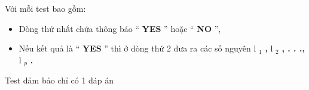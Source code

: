 Với mỗi test bao gồm:
\begin{itemize}
	\item Dòng thứ nhất chứa thông báo “ \textbf{YES} ” hoặc “ \textbf{NO} ”,
	\item Nếu kết quả là “ \textbf{YES} ” thì ở dòng thứ 2 đưa ra các số nguyên l \textbf{$_ 1 $}\textbf{ , } l \textbf{$_ 2 $}\textbf{ , . . ., } l $_ p $\textbf{ . }
\end{itemize}

Test đảm bảo chỉ có 1 đáp án